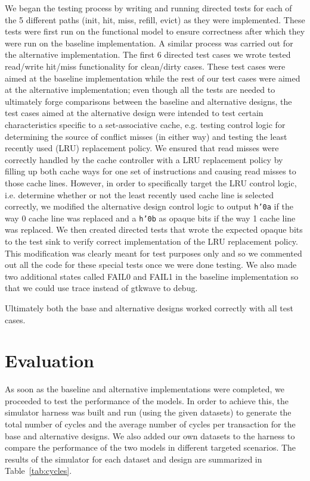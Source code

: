 \documentclass[10pt]{article}
\begin{document}
We began the testing process by writing and running directed tests for each of the 5 different paths (init, hit, miss, refill, evict) as they were implemented. These tests were first run on the functional model to ensure correctness after which they were run on the baseline implementation. A similar process was carried out for the alternative implementation. The first 6 directed test cases we wrote tested read/write hit/miss functionality for clean/dirty cases. These test cases were aimed at the baseline implementation while the rest of our test cases were aimed at the alternative implementation; even though all the tests are needed to ultimately forge comparisons between the baseline and alternative designs, the test cases aimed at the alternative design were intended to test certain characteristics specific to a set-associative cache, e.g. testing control logic for determining the source of conflict misses (in either way) and testing the least recently used (LRU) replacement policy. We ensured that read misses were correctly handled by the cache controller with a LRU replacement policy by filling up both cache ways for one set of instructions and causing read misses to those cache lines. However, in order to specifically target the LRU control logic, i.e. determine whether or not the least recently used cache line is selected correctly, we modified the alternative design control logic to output \texttt{h'0a} if the way 0 cache line was replaced and a \texttt{h'0b} as opaque bits if the way 1 cache line was replaced. We then created directed tests that wrote the expected opaque bits to the test sink to verify correct implementation of the LRU replacement policy. This modification was clearly meant for test purposes only and so we commented out all the code for these special tests once we were done testing. We also made two additional states called FAIL0 and FAIL1 in the baseline implementation so that we could use trace instead of gtkwave to debug.





Ultimately both the base and alternative designs worked correctly with all test cases.  \\


\section{Evaluation}

As soon as the baseline and alternative implementations were completed, we proceeded to test the performance of the models. In order to achieve this, the simulator harness was built and run (using the given datasets) to generate the total number of cycles and the average number of cycles per transaction for the base and alternative designs. We also added our own datasets to the harness to compare the performance of the two models in different targeted scenarios. The results of the simulator for each dataset and design are summarized in Table~\ref{tab:cycles}. \\
\end{document}
